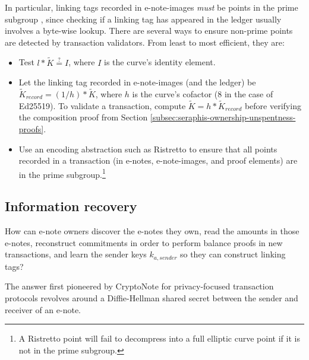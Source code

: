 In particular, linking tags recorded in e-note-images {\em must} be points in the prime subgroup \cite{key-image-bug}, since checking if a linking tag has appeared in the ledger usually involves a byte-wise lookup. There are several ways to ensure non-prime points are detected by transaction validators. From least to most efficient, they are:

\begin{itemize}
    \item Test $l*\tilde{K} \stackrel{?}{=} I$, where $I$ is the curve's identity element.

    \item Let the linking tag recorded in e-note-images (and the ledger) be $\tilde{K}_{record} = (1/h)*\tilde{K}$, where $h$ is the curve's cofactor (8 in the case of Ed25519). To validate a transaction, compute $\tilde{K} = h*\tilde{K}_{record}$ before verifying the composition proof from Section \ref{subsec:seraphis-ownership-unspentness-proofs}.

    \item Use an encoding abstraction such as Ristretto \cite{ristretto} to ensure that all points recorded in a transaction (in e-notes, e-note-images, and proof elements) are in the prime subgroup.\footnote{A Ristretto point will fail to decompress into a full elliptic curve point if it is not in the prime subgroup.}
\end{itemize}


\subsection{Information recovery}
\label{subsec:implementers-information-recovery}

How can e-note owners discover the e-notes they own, read the amounts in those e-notes, reconstruct commitments in order to perform balance proofs in new transactions, and learn the sender keys $k_{a,sender}$ so they can construct linking tags?

The answer first pioneered by CryptoNote \cite{cryptoNoteWhitePaper} for privacy-focused transaction protocols revolves around a Diffie-Hellman shared secret between the sender and receiver of an e-note.

